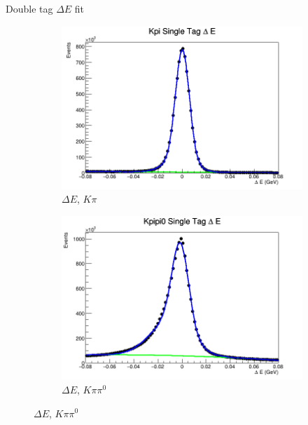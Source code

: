 \documentclass{beamer}
\begin{document}
\begin{frame}{Double tag $\Delta E$ fit}
\begin{figure}
\begin{subfigure}{0.4\textwidth}
      \centering
      \includegraphics[width=\textwidth]{KpiDeltaE.png}
      \caption{$\Delta E$, $K\pi$}
    \end{subfigure}%
    \begin{subfigure}{0.4\textwidth}
      \centering
      \includegraphics[width=\textwidth]{Kpipi0DeltaE.png}
      \caption{$\Delta E$, $K\pi\pi^0$}
    \end{subfigure}
  \end{figure}
\end{frame}
\end{document}
